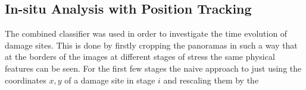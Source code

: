 \subsection{In-situ Analysis with Position Tracking}
The combined classifier was used in order to investigate the time evolution of damage sites. This is done by firstly cropping the panoramas in such a way that at the borders of the images at different stages of stress the same physical features can be seen. For the first few stages the naive approach to just using the coordinates $x,y$ of a damage site in stage $i$ and rescaling them by the 



















